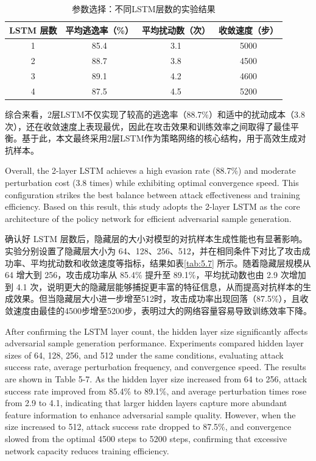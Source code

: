 \begin{table}[htbp]
	\centering
	\caption{参数选择：不同LSTM层数的实验结果}
	\label{tab:5.6}
	\begin{tabular*}{0.9\textwidth}{@{\extracolsep{\fill}}cccc}
		\toprule
		LSTM 层数 & 平均逃逸率（\%） & 平均扰动数（次） & 收敛速度（步） \\
		\midrule
		1 & 85.4 & 3.1 & 5000 \\
		2 & 88.7 & 3.8 & 4500 \\
		3 & 89.1 & 4.2 & 4600 \\
		4 & 87.5 & 4.5 & 5200 \\
		\bottomrule
	\end{tabular*}
\end{table}

综合来看，2层LSTM不仅实现了较高的逃逸率（88.7\%）和适中的扰动成本（3.8 次），还在收敛速度上表现最优，因此在攻击效果和训练效率之间取得了最佳平衡。基于此，本文最终采用2层LSTM作为策略网络的核心结构，用于高效生成对抗样本。

Overall, the 2-layer LSTM achieves a high evasion rate (88.7\%) and moderate perturbation cost (3.8 times) while exhibiting optimal convergence speed. This configuration strikes the best balance between attack effectiveness and training efficiency. Based on this result, this study adopts the 2-layer LSTM as the core architecture of the policy network for efficient adversarial sample generation.

确认好 LSTM 层数后，隐藏层的大小对模型的对抗样本生成性能也有显著影响。实验分别设置了隐藏层大小为 64、128、256、512，并在相同条件下对比了攻击成功率、平均扰动数和收敛速度等指标，结果如表\ref{tab:5.7} 所示。随着隐藏层规模从 64 增大到 256，攻击成功率从 85.4\% 提升至 89.1\%，平均扰动数也由 2.9 次增加到 4.1 次，说明更大的隐藏层能够捕捉更丰富的特征信息，从而提高对抗样本的生成效果。但当隐藏层大小进一步增至512时，攻击成功率出现回落（87.5\%），且收敛速度由最佳的4500步增至5200步，表明过大的网络容量容易导致训练效率下降。

After confirming the LSTM layer count, the hidden layer size significantly affects adversarial sample generation performance. Experiments compared hidden layer sizes of 64, 128, 256, and 512 under the same conditions, evaluating attack success rate, average perturbation frequency, and convergence speed. The results are shown in Table 5-7. As the hidden layer size increased from 64 to 256, attack success rate improved from 85.4\% to 89.1\%, and average perturbation times rose from 2.9 to 4.1, indicating that larger hidden layers capture more abundant feature information to enhance adversarial sample quality. However, when the size increased to 512, attack success rate dropped to 87.5\%, and convergence slowed from the optimal 4500 steps to 5200 steps, confirming that excessive network capacity reduces training efficiency.

